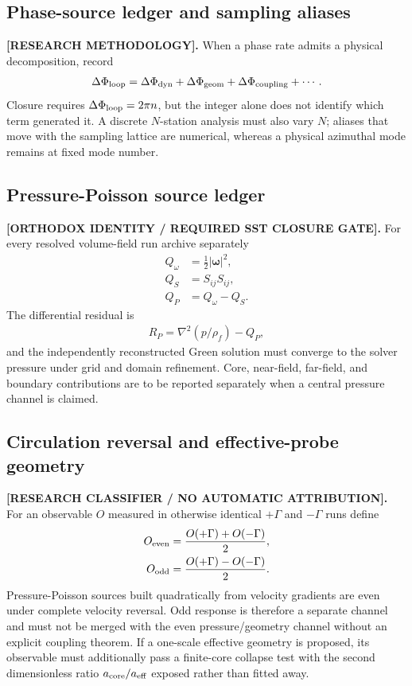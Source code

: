 \subsection{Phase-source ledger and sampling aliases}
\textbf{[RESEARCH METHODOLOGY].}
When a phase rate admits a physical decomposition, record
\begin{align}
\Delta\Phi_{\rm loop}
=\Delta\Phi_{\rm dyn}
+\Delta\Phi_{\rm geom}
+\Delta\Phi_{\rm coupling}
+\cdots .
\end{align}
Closure requires \(\Delta\Phi_{\rm loop}=2\pi n\), but the integer alone does
not identify which term generated it.  A discrete \(N\)-station analysis must
also vary \(N\); aliases that move with the sampling lattice are numerical,
whereas a physical azimuthal mode remains at fixed mode number.

\subsection{Pressure-Poisson source ledger}
\textbf{[ORTHODOX IDENTITY / REQUIRED SST CLOSURE GATE].}
For every resolved volume-field run archive separately
\begin{align}
Q_\omega&=\frac12|\boldsymbol\omega|^2,\\
Q_S&=S_{ij}S_{ij},\\
Q_P&=Q_\omega-Q_S.
\end{align}
The differential residual is
\begin{align}
R_P
=\nabla^2(p/\rho_{\!f})-Q_P,
\end{align}
and the independently reconstructed Green solution must converge to the
solver pressure under grid and domain refinement.  Core, near-field, far-field,
and boundary contributions are to be reported separately when a central
pressure channel is claimed.

\subsection{Circulation reversal and effective-probe geometry}
\textbf{[RESEARCH CLASSIFIER / NO AUTOMATIC ATTRIBUTION].}
For an observable \(O\) measured in otherwise identical \(+\Gamma\) and
\(-\Gamma\) runs define
\begin{align}
O_{\rm even}&=\frac{O(+\Gamma)+O(-\Gamma)}{2},\\
O_{\rm odd}&=\frac{O(+\Gamma)-O(-\Gamma)}{2}.
\end{align}
Pressure-Poisson sources built quadratically from velocity gradients are even
under complete velocity reversal.  Odd response is therefore a separate
channel and must not be merged with the even pressure/geometry channel
without an explicit coupling theorem.  If a one-scale effective geometry is
proposed, its observable must additionally pass a finite-core collapse test
with the second dimensionless ratio \(a_{\rm core}/a_{\rm eff}\) exposed rather
than fitted away.

